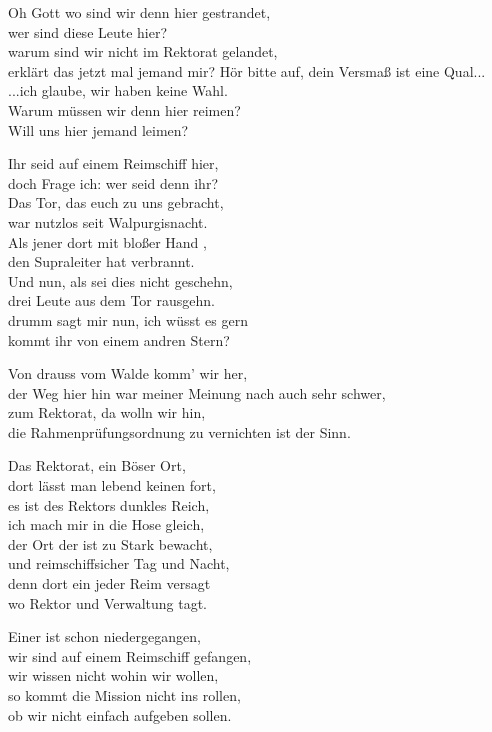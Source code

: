 \begin{verseplay}[7em]
\s{\Legolars} Oh Gott wo sind wir denn hier gestrandet,\\
wer sind diese Leute hier?\\
warum sind wir nicht im Rektorat gelandet,\\
erklärt das jetzt mal jemand mir?
\s{\Monk} Hör bitte auf, dein Versmaß ist eine Qual...
\s{\Frodo} ...ich glaube, wir haben keine Wahl.\\
Warum müssen wir denn hier reimen?\\
Will uns hier jemand leimen?

\s{\Paul} Ihr seid auf einem Reimschiff hier,\\
doch Frage ich: wer seid denn ihr?\\
Das Tor, das euch zu uns gebracht,\\
war nutzlos seit Walpurgisnacht.\\
Als jener dort mit bloßer Hand ,\\
den Supraleiter hat verbrannt.\\
Und nun, als sei dies nicht geschehn,\\
drei Leute aus dem Tor rausgehn.\\
drumm sagt mir nun, ich wüsst es gern\\
kommt ihr von einem andren Stern?

\s{\Legolars} Von drauss vom Walde komm' wir her,\\
der Weg hier hin war meiner Meinung nach auch sehr schwer,\\
zum Rektorat, da wolln wir hin,\\
die Rahmenprüfungsordnung zu vernichten ist der Sinn.

\s{\Monk} 

\s{\Spock} Das Rektorat, ein Böser Ort,\\
dort lässt man lebend keinen fort,\\
es ist des Rektors dunkles Reich,\\
ich mach mir in die Hose gleich,\\
der Ort der ist zu Stark bewacht,\\
und reimschiffsicher Tag und Nacht,\\
denn dort ein jeder Reim versagt\\
wo Rektor und Verwaltung tagt.

\s{\Frodo} Einer ist schon niedergegangen,\\
wir sind auf einem Reimschiff gefangen,\\
wir wissen nicht wohin wir wollen,\\
so kommt die Mission nicht ins rollen,\\
ob wir nicht einfach aufgeben sollen.


\end{verseplay}

